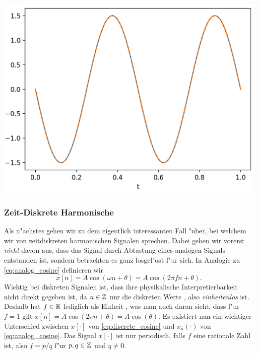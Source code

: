 \begin{listing}
    \begin{minipage}{0.49\textwidth}
        \inputminted[firstline=4]{python3}{code/cont_harms.py}
    \end{minipage}%
    \begin{minipage}{0.49\textwidth}
        \strut\vspace*{-\baselineskip}\newline
        \includegraphics[width=\textwidth]{code/cont_harms.png}
    \end{minipage}
    \label{py:cont_harms}
\end{listing}
\FloatBarrier
%
\subsubsection{Zeit-Diskrete Harmonische}
%
Als n"achstes gehen wir zu dem eigentlich interessanten Fall "uber, bei welchem wir von zeitdiskreten harmonischen Signalen sprechen.
Dabei gehen wir vorerst \emph{nicht} davon aus, dass das Signal durch Abtastung eines analogen Signals entstanden ist, sondern betrachten es ganz losgel"ost f"ur sich.
In Analogie zu \eqref{eq:analog_cosine} definieren wir
%
\begin{equation}\label{eq:discrete_cosine}
    x[n] = A \cos(\omega n + \theta) = A \cos(2 \pi f n + \theta).
\end{equation}
%
Wichtig bei diskreten Signalen ist, dass ihre physikalische Interpretierbarkeit nicht direkt gegeben ist, da $n \in \mathbb{Z}$ nur die diskreten Werte , also \emph{einheitenlos} ist.
Deshalb hat $f \in \mathbb{R}$ lediglich als Einheit , was man auch daran sieht, dass f"ur $f = 1$ gilt $x[n] = A \cos(2\pi n + \theta) = A \cos(\theta)$.
Es existiert nun ein wichtiger Unterschied zwischen $x[\cdot]$ von \eqref{eq:discrete_cosine} und $x_a(\cdot)$ von \eqref{eq:analog_cosine}.
Das Signal $x[\cdot]$ ist nur periodisch, falls $f$ eine rationale Zahl ist, also $f = p/q$ f"ur $p,q \in \mathbb{Z}$ und $q \neq 0$.

